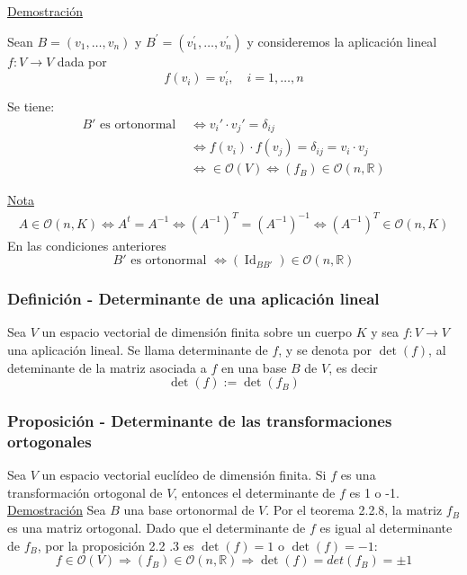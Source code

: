 \documentclass[12pt, a4paper, ones, notitlepage, openany,titlepage]{article}
\newcommand{\demostracion}{\noindent\underline{Demostración}}
\begin{document}
\demostracion

Sean $B=\left(v_{1}, \ldots, v_{n}\right)$ y $B^{\prime}=\left(v_{1}^{\prime}, \ldots, v_{n}^{\prime}\right)$ y consideremos la aplicación lineal $f: V \rightarrow V$ dada por
$$
f\left(v_{i}\right)=v_{i}^{\prime}, \quad i=1, \ldots, n
$$

\noindent Se tiene:
$$
\begin{aligned}
	B' \text{ es ortonormal } & \Longleftrightarrow v_i' \cdot v_j' = \delta_{ij} \\
	& \Longleftrightarrow f(v_i) \cdot f(v_j) = \delta_{ij} = v_i \cdot v_j \\
	& \Longleftrightarrow \in \mathcal{O} (V) \Longleftrightarrow (f_B) \in \mathcal{O} (n, \mathbb{R})
\end{aligned}
$$

\noindent\underline{Nota}
$$
\begin{aligned}
	A \in \mathcal{O} (n,K) \Longleftrightarrow A^t = A^{-1} \Longleftrightarrow (A^{-1})^T = (A^{-1})^{-1} \Longleftrightarrow (A^{-1})^T \in \mathcal{O} (n,K)
\end{aligned}
$$
\noindent En las condiciones anteriores
$$
B' \text{ es ortonormal } \Longleftrightarrow (\operatorname{Id}_{BB'}) \in \mathcal{O} (n, \mathbb{R})
$$

\subsubsection{Definición - Determinante de una aplicación lineal}
Sea $V$ un espacio vectorial de dimensión finita sobre un cuerpo $K$ y sea $f: V \rightarrow V$ una aplicación lineal. Se llama determinante de $f$, y se denota por $\det(f)$, al deteminante de la matriz asociada a $f$ en una base $B$ de $V$, es decir
$$
\det(f):=\det\left(f_{B}\right)
$$

\subsubsection{Proposición - Determinante de las transformaciones ortogonales}
Sea $V$ un espacio vectorial euclídeo de dimensión finita. Si $f$ es una transformación ortogonal de $V$, entonces el determinante de $f$ es 1 o -1.\\

\demostracion
Sea $B$ una base ortonormal de $V$. Por el teorema 2.2.8, la matriz $f_{B}$ es una matriz ortogonal. Dado que el determinante de $f$ es igual al determinante de $f_{B}$, por la proposición 2.2 .3 es $\det(f)=1$ o $\det(f)=-1$:
$$
f \in \mathcal{O} (V) \Longrightarrow (f_B) \in \mathcal{O} (n, \mathbb{R}) \Longrightarrow \det (f) = det(f_B) = \pm 1
$$
\end{document}

